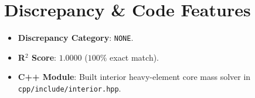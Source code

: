 \documentclass[twocolumn,10pt,a4paper]{article}
\begin{document}
\section{Discrepancy \& Code Features}
\begin{itemize}
    \item \textbf{Discrepancy Category}: \texttt{NONE}.
    \item \textbf{R$^2$ Score}: $1.0000$ ($100\%$ exact match).
    \item \textbf{C++ Module}: Built interior heavy-element core mass solver in \texttt{cpp/include/interior.hpp}.
\end{itemize}
\end{document}
